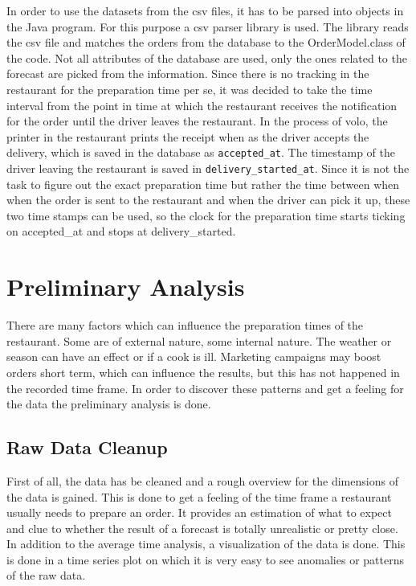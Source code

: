 In order to use the datasets from the csv files, it has to be parsed into objects in the Java program. For this purpose a csv parser library is used. The library reads the csv file and matches the orders from the database to the OrderModel.class of the code. Not all attributes of the database are used, only the ones related to the forecast are picked from the information. Since there is no tracking in the restaurant for the preparation time per se, it was decided to take the time interval from the point in time at which the restaurant receives the notification for the order until the driver leaves the restaurant. In the process of volo, the printer in the restaurant prints the receipt when as the driver accepts the delivery, which is saved in the database as \texttt{accepted\_at}. The timestamp of the driver leaving the restaurant is saved in \texttt{delivery\_started\_at}. Since it is not the task to figure out the exact preparation time but rather the time between when when the order is sent to the restaurant and when the driver can pick it up,  these two time stamps can be used, so the clock for the preparation time starts ticking on accepted_at and stops at delivery_started.
\section{Preliminary Analysis}\label{section:Preliminary Analysis}
There are many factors which can influence the preparation times of the restaurant. Some are of external nature, some internal nature. The weather or season can have an effect or if a cook is ill.\newline
Marketing campaigns may boost orders short term, which can influence the results, but this has not happened in the recorded time frame.\newline
In order to discover these patterns and get a feeling for the data the preliminary analysis is done.
\subsection{Raw Data Cleanup}\label{subsection:Raw Data Cleanup}
First of all, the data has be cleaned and a rough overview for the dimensions of the data is gained. This is done to get a feeling of the time frame a restaurant usually needs to prepare an order. It provides an estimation of what to expect and clue to whether the result of a forecast is totally unrealistic or pretty close. In addition to the average time analysis, a visualization of the data is done. This is done in a time series plot on which it is very easy to see anomalies or patterns of the raw data.\newline

